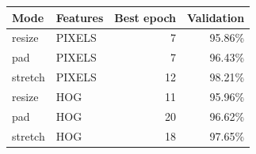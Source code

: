 \begin{center}\begin{tabular}{llrr}
\toprule
Mode & Features & Best epoch & Validation \\\midrule
resize & PIXELS & 7 & 95.86\% \\
pad & PIXELS & 7 & 96.43\% \\
stretch & PIXELS & 12 & 98.21\% \\
resize & HOG & 11 & 95.96\% \\
pad & HOG & 20 & 96.62\% \\
stretch & HOG & 18 & 97.65\% \\
\bottomrule\end{tabular}\end{center}
